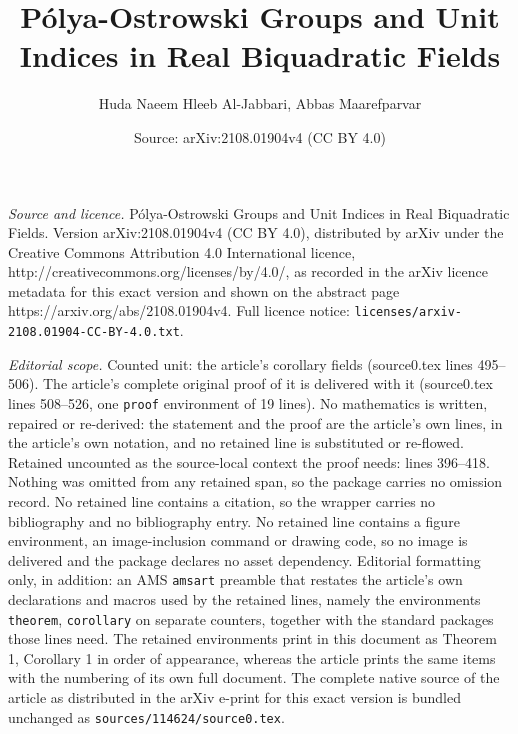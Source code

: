 \documentclass[10pt,a4paper]{amsart}
\title{P\'olya-Ostrowski Groups and Unit Indices in Real Biquadratic Fields}
\author{Huda Naeem Hleeb Al-Jabbari, Abbas Maarefparvar}
\date{Source: arXiv:2108.01904v4 (CC BY 4.0)}
\begin{document}
\maketitle

\noindent\emph{Source and licence.} P\'olya-Ostrowski Groups and Unit Indices in Real Biquadratic Fields. Version arXiv:2108.01904v4 (CC BY 4.0), distributed by arXiv under the Creative Commons Attribution 4.0 International licence, http://creativecommons.org/licenses/by/4.0/, as recorded in the arXiv licence metadata for this exact version and shown on the abstract page https://arxiv.org/abs/2108.01904v4. Full licence notice: \texttt{licenses/arxiv-2108.01904-CC-BY-4.0.txt}.\par\smallskip

\noindent\textit{Editorial scope.} Counted unit: the article's corollary fields (source0.tex lines 495--506). The article's complete original proof of it is delivered with it (source0.tex lines 508--526, one \texttt{proof} environment of 19 lines). No mathematics is written, repaired or re-derived: the statement and the proof are the article's own lines, in the article's own notation, and no retained line is substituted or re-flowed.  Retained uncounted as the source-local context the proof needs: lines 396--418.  Nothing was omitted from any retained span, so the package carries no omission record.  No retained line contains a citation, so the wrapper carries no bibliography and no bibliography entry.  No retained line contains a figure environment, an image-inclusion command or drawing code, so no image is delivered and the package declares no asset dependency.  Editorial formatting only, in addition: an AMS \texttt{amsart} preamble that restates the article's own declarations and macros used by the retained lines, namely the environments \texttt{theorem}, \texttt{corollary} on separate counters, together with the standard packages those lines need.  The retained environments print in this document as Theorem 1, Corollary 1 in order of appearance, whereas the article prints the same items with the numbering of its own full document.  The complete native source of the article as distributed in the arXiv e-print for this exact version is bundled unchanged as \texttt{sources/114624/source0.tex}.
\end{document}
